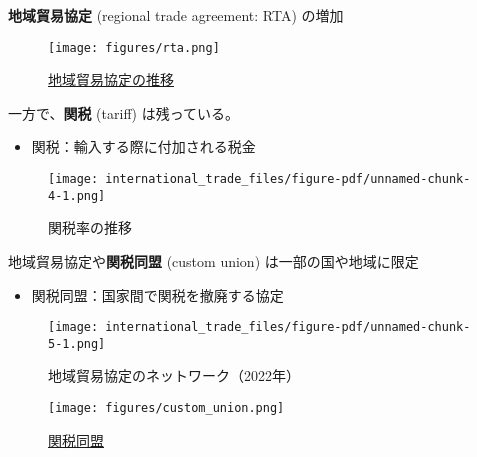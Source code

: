 \documentclass[
  xelatex,
  ja=standard]{bxjsarticle}
\providecommand{\tightlist}{%
  \setlength{\itemsep}{0pt}\setlength{\parskip}{0pt}}\usepackage{longtable,booktabs,array}
\begin{document}
\textbf{地域貿易協定} (regional trade agreement: RTA) の増加

\begin{figure}[htpb]

{\centering \texttt{[image: figures/rta.png]}

}

\caption{\href{https://rtais.wto.org/UI/charts.aspx}{地域貿易協定の推移}}

\end{figure}

一方で、\textbf{関税} (tariff) は残っている。

\begin{itemize}
\tightlist
\item
  関税：輸入する際に付加される税金
\end{itemize}

\begin{figure}[htpb]

{\centering \texttt{[image: international\_trade\_files/figure-pdf/unnamed-chunk-4-1.png]}

}

\caption{関税率の推移}

\end{figure}

地域貿易協定や\textbf{関税同盟} (custom union) は一部の国や地域に限定

\begin{itemize}
\tightlist
\item
  関税同盟：国家間で関税を撤廃する協定
\end{itemize}

\begin{figure}[htpb]

{\centering \texttt{[image: international\_trade\_files/figure-pdf/unnamed-chunk-5-1.png]}

}

\caption{地域貿易協定のネットワーク（2022年）\citep{egger2008}}

\end{figure}

\begin{figure}[htpb]

{\centering \texttt{[image: figures/custom\_union.png]}

}

\caption{\href{https://commons.wikimedia.org/wiki/File:Customs_Unions_World.svg}{関税同盟}}

\end{figure}
\end{document}
